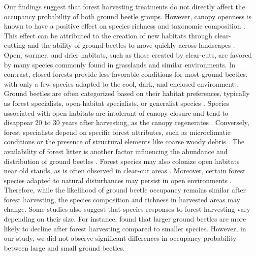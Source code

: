 Our findings suggest that forest harvesting treatments do not directly affect the occupancy probability of both ground beetle groups. 
However, canopy openness is known to have a positive effect on species richness and taxonomic composition \citep{Halme1993Carabidbeetles,Heliola2001Distributioncarabid,Koivula2002Alternativeharvesting}. 
This effect can be attributed to the creation of new habitats through clear-cutting and the ability of ground beetles to move quickly across landscapes \citep{Niemela2007effectsforestry}. 
Open, warmer, and drier habitats, such as those created by clear-cuts, are favored by many species commonly found in grasslands and similar environments. 
In contrast, closed forests provide less favorable conditions for most ground beetles, with only a few species adapted to the cool, dark, and enclosed environment \citep{Niemela1993Effectsclearcut,koivulaBorealCarabidbeetleColeoptera2002a}. 
Ground beetles are often categorized based on their habitat preferences, typically as forest specialists, open-habitat specialists, or generalist species \citep{Niemela2007effectsforestry}. 
Species associated with open habitats are intolerant of canopy closure and tend to disappear 20 to 30 years after harvesting, as the canopy regenerates \citep{Niemela1996importancesmallscale,Koivula2002Alternativeharvesting}. 
Conversely, forest specialists depend on specific forest attributes, such as microclimatic conditions or the presence of structural elements like coarse woody debris \citep{Niemela1996importancesmallscale,Heliola2001Distributioncarabid,Koivula2002Alternativeharvesting,Work2004Standcomposition}. 
The availability of forest litter is another factor influencing the abundance and distribution of ground beetles \citep{koivula.LeafLitterSmallscale1999,Heliola2001Distributioncarabid,Magura2005ImpactsLeaflitter}. 
Forest species may also colonize open habitats near old stands, as is often observed in clear-cut areas \citep{Spence1996Northernforestry,Koivula2002Alternativeharvesting}. 
Moreover, certain forest species adapted to natural disturbances may persist in open environments \citep{Niemela2007effectsforestry}. 
Therefore, while the likelihood of ground beetle occupancy remains similar after forest harvesting, the species composition and richness in harvested areas may change. 
Some studies also suggest that species responses to forest harvesting vary depending on their size. 
For instance, \cite{Nolte2019Habitatspecialization} found that larger ground beetles are more likely to decline after forest harvesting compared to smaller species. 
However, in our study, we did not observe significant differences in occupancy probability between large and small ground beetles. 

